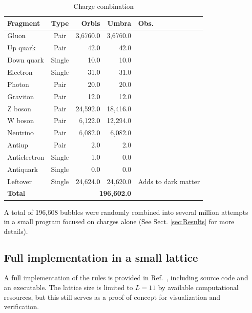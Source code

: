 \documentclass{ijuc}
\begin{document}
\begin{table}
\caption{Charge combination}

\medskip{}
\label{combina}
\begin{centering}
{\small{}}%
\begin{tabular}{|l|c|r|r|l|}
\hline 
\textbf{\small{}Fragment} & \textbf{\small{}Type} & \textbf{\small{}Orbis} & \textbf{Umbra} & \textbf{\small{}Obs.}\tabularnewline
\hline 
\hline 
{\small{}Gluon} & {\small{}Pair} & {\small{}3,6760.0} & {\small{}3,6760.0} & \tabularnewline
\hline 
{\small{}Up quark} & {\small{}Pair} & {\small{}42.0} & {\small{}42.0} & \tabularnewline
\hline 
{\small{}Down quark} & {\small{}Single} & {\small{}10.0} & {\small{}10.0} & \tabularnewline
\hline 
{\small{}Electron} & {\small{}Single} & {\small{}31.0} & {\small{}31.0} & \tabularnewline
\hline 
{\small{}Photon} & {\small{}Pair} & {\small{}20.0} & {\small{}20.0} & \tabularnewline
\hline 
{\small{}Graviton} & {\small{}Pair} & {\small{}12.0} & {\small{}12.0} & \tabularnewline
\hline 
{\small{}Z boson} & {\small{}Pair} & {\small{}24,592.0} & {\small{}18,416.0} & \tabularnewline
\hline 
{\small{}W boson} & {\small{}Pair} & {\small{}6,122.0} & {\small{}12,294.0} & \tabularnewline
\hline 
{\small{}Neutrino} & {\small{}Pair} & {\small{}6,082.0} & {\small{}6,082.0} & \tabularnewline
\hline 
{\small{}Antiup} & {\small{}Pair} & {\small{}2.0} & {\small{}2.0} & \tabularnewline
\hline 
{\small{}Antielectron} & {\small{}Single} & {\small{}1.0} & {\small{}0.0} & \tabularnewline
\hline 
{\small{}Antiquark} & {\small{}Single} & {\small{}0.0} & {\small{}0.0} & \tabularnewline
\hline 
{\small{}Leftover} & {\small{}Single} & {\small{}24,624.0} & {\small{}24,620.0} & {\small{}Adds to dark matter}\tabularnewline
\hline 
\textbf{\small{}Total} &  & \multicolumn{2}{r|}{\textbf{\small{}196,602.0 }} & \tabularnewline
\hline 
\end{tabular}{\small\par}
\par\end{centering}
\medskip{}

{\small{}A total of 196,608 bubbles were randomly combined into several million attempts in a small program focused on charges alone (See Sect. \ref{sec:Results} for more details).}{\small\par}
\end{table}

\subsection{Full implementation in a small lattice}
A full implementation of the rules is provided in Ref.~\cite{af_neto}, including source code and an executable. The lattice size is limited to $L=11$ by available computational resources, but this still serves as a proof of concept for visualization and verification.
\end{document}

